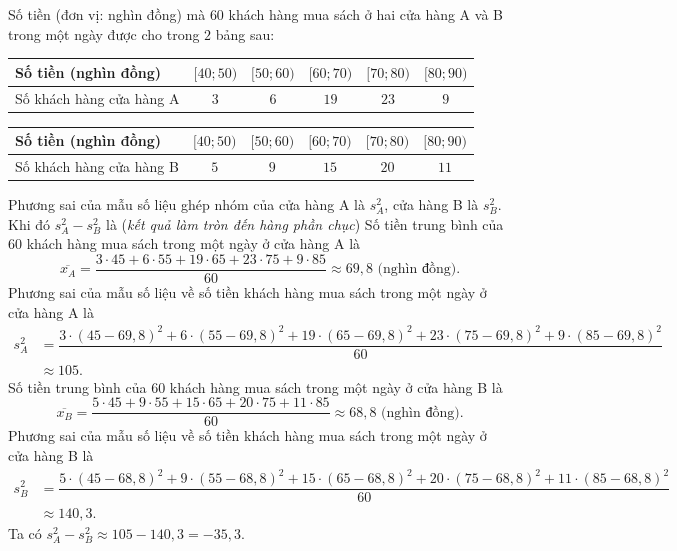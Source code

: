 \begin{ex}%
	Số tiền (đơn vị: nghìn đồng) mà $60$ khách hàng mua sách ở hai cửa hàng A và B trong một ngày được cho trong $2$ bảng sau:
	\begin{center}
		\begin{tabular}{|>{\centering\arraybackslash}m{6cm}|c|c|c|c|c|}
			\hline
			Số tiền (nghìn đồng) & $[40; 50)$ & $[50; 60)$ & $[60; 70)$ & $[70; 80)$ & $[80; 90)$   \\ \hline
			Số khách hàng cửa hàng A & $3$ & $6$ & $19$ & $23$ & $9$ \\ \hline
		\end{tabular} 
	\end{center}
	
	\begin{center}
		\begin{tabular}{|>{\centering\arraybackslash}m{6cm}|c|c|c|c|c|}
			\hline
			Số tiền (nghìn đồng) & $[40; 50)$ & $[50; 60)$ & $[60; 70)$ & $[70; 80)$ & $[80; 90)$   \\ \hline
			Số khách hàng cửa hàng B & $5$ & $9$ & $15$ & $20$ & $11$ \\ \hline
		\end{tabular}
	\end{center}
	Phương sai của mẫu số liệu ghép nhóm của cửa hàng A là $s_A^2$, cửa hàng B là $s_B^2$. Khi đó $s_A^2 - s_B^2$ là (\textit{kết quả làm tròn đến hàng phần chục})
	\loigiai
	{ Số tiền trung bình của $60$ khách hàng mua sách trong một ngày ở cửa hàng A là
		\[\overline{x_A} = \dfrac{3 \cdot 45 + 6 \cdot 55 + 19 \cdot 65 + 23 \cdot 75 + 9 \cdot 85}{60} \approx 69{,}8 \text{ (nghìn đồng).}\]
		Phương sai của mẫu số liệu về số tiền khách hàng mua sách trong một ngày ở cửa hàng A là 
		\begin{align*}
		s_A^2 &= \dfrac{3 \cdot (45 - 69{,}8)^2 + 6 \cdot (55 - 69{,}8)^2 + 19 \cdot (65 - 69{,}8)^2 + 23 \cdot (75 - 69{,}8)^2 + 9 \cdot (85 - 69{,}8)^2}{60} \\
		&\approx  105.
		\end{align*}
		 Số tiền trung bình của $60$ khách hàng mua sách trong một ngày ở cửa hàng B là
		\[\overline{x_B} = \dfrac{5 \cdot 45 + 9 \cdot 55 + 15 \cdot 65 + 20 \cdot 75 + 11 \cdot 85}{60} \approx 68{,}8 \text{ (nghìn đồng).}\]
		Phương sai của mẫu số liệu về số tiền khách hàng mua sách trong một ngày ở cửa hàng B là 
		\begin{align*}
		s_B^2 &= \dfrac{5 \cdot (45 - 68{,}8)^2 + 9 \cdot (55 - 68{,}8)^2 + 15 \cdot (65 - 68{,}8)^2 + 20 \cdot (75 - 68{,}8)^2 + 11 \cdot (85 - 68{,}8)^2}{60} \\
		&\approx 140{,}3.
		\end{align*}
		Ta có $s_A^2 - s_B^2 \approx 105 - 140{,}3 = -35{,}3$.
	}
\end{ex}

